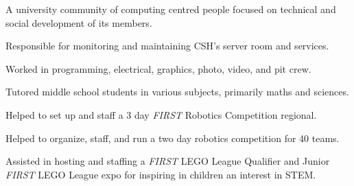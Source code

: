 \cvtag{\LaTeX}



\medskip
{}
A university community of computing centred people focused on technical and social development of its members.

Responsible for monitoring and maintaining CSH's server room and services.

\divider

Worked in programming, electrical, graphics, photo, video, and pit crew.




Tutored middle school students in various subjects, primarily maths and sciences.

\divider

Helped to set up and staff a 3 day \textit{FIRST} Robotics Competition regional.

Helped to organize, staff, and run a two day robotics competition for 40 teams.

Assisted in hosting and staffing a \textit{FIRST} LEGO\textsuperscript{\textregistered} League Qualifier and Junior \textit{FIRST} LEGO League expo for inspiring in children an interest in STEM.
